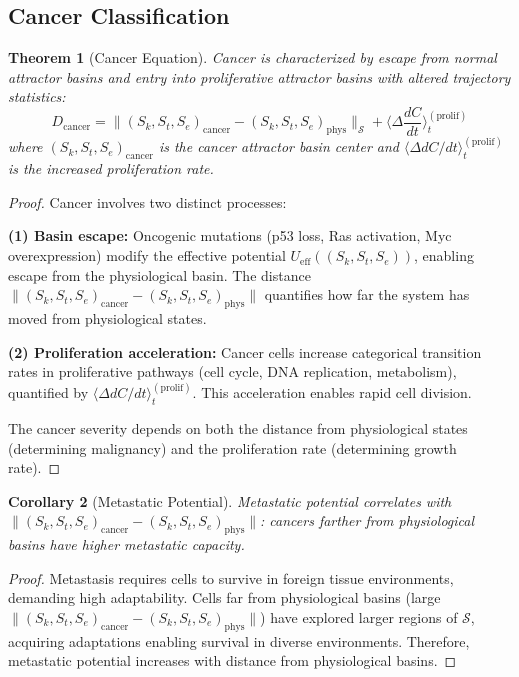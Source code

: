 \documentclass[11pt,twocolumn,a4paper]{article}
\newtheorem{theorem}{Theorem}[section]
\newtheorem{corollary}[theorem]{Corollary}
\theoremstyle{definition}
\theoremstyle{remark}
\newcommand{\Sspace}{\mathcal{S}}
\newcommand{\Scoord}{(\Sk,\St,\Se)}
\newcommand{\Sk}{S_k}
\newcommand{\St}{S_t}
\newcommand{\Se}{S_e}
\begin{document}
\subsection{Cancer Classification}

\begin{theorem}[Cancer Equation]
\label{thm:cancer}
Cancer is characterized by escape from normal attractor basins and entry into proliferative attractor basins with altered trajectory statistics:
\begin{equation}
D_{\mathrm{cancer}} = \|\Scoord_{\mathrm{cancer}} - \Scoord_{\mathrm{phys}}\|_{\Sspace} + \langle\Delta \frac{dC}{dt}\rangle_t^{\mathrm{(prolif)}}
\label{eq:cancer}
\end{equation}
where $\Scoord_{\mathrm{cancer}}$ is the cancer attractor basin center and $\langle\Delta dC/dt\rangle_t^{\mathrm{(prolif)}}$ is the increased proliferation rate.
\end{theorem}

\begin{proof}
Cancer involves two distinct processes:

\textbf{(1) Basin escape:} Oncogenic mutations (p53 loss, Ras activation, Myc overexpression) modify the effective potential $U_{\mathrm{eff}}(\Scoord)$, enabling escape from the physiological basin. The distance $\|\Scoord_{\mathrm{cancer}} - \Scoord_{\mathrm{phys}}\|$ quantifies how far the system has moved from physiological states.

\textbf{(2) Proliferation acceleration:} Cancer cells increase categorical transition rates in proliferative pathways (cell cycle, DNA replication, metabolism), quantified by $\langle\Delta dC/dt\rangle_t^{\mathrm{(prolif)}}$. This acceleration enables rapid cell division.

The cancer severity depends on both the distance from physiological states (determining malignancy) and the proliferation rate (determining growth rate).
\end{proof}

\begin{corollary}[Metastatic Potential]
\label{cor:metastatic_potential}
Metastatic potential correlates with $\|\Scoord_{\mathrm{cancer}} - \Scoord_{\mathrm{phys}}\|$: cancers farther from physiological basins have higher metastatic capacity.
\end{corollary}

\begin{proof}
Metastasis requires cells to survive in foreign tissue environments, demanding high adaptability. Cells far from physiological basins (large $\|\Scoord_{\mathrm{cancer}} - \Scoord_{\mathrm{phys}}\|$) have explored larger regions of $\Sspace$, acquiring adaptations enabling survival in diverse environments. Therefore, metastatic potential increases with distance from physiological basins.
\end{proof}
\end{document}
